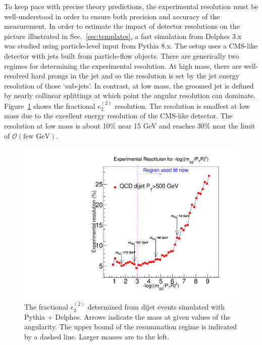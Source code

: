 To keep pace with precise theory predictions, the experimental resolution must be well-understood in order to ensure both precision and accuracy of the measurement.  In order to estimate the impact of detector resolutions on the picture illustrated in Sec.~\ref{sec:templates}, a fast simulation from Delphes 3.x~\cite{deFavereau:2013fsa} was studied using particle-level input from Pythia 8.x.  The setup uses a CMS-like detector with jets built from particle-flow objects.  There are generically two regimes for determining the experimental resolution.  At high mass, there are well-resolved hard prongs in the jet and so the resolution is set by the jet energy resolution of those `sub-jets'.  In contrast, at low mass, the groomed jet is defined by nearly collinear splittings at which point the angular resolution can dominate.  Figure~\ref{fig:resolution} shows the fractional $e_2^{(2)}$ resolution.  The resolution is smallest at low mass due to the excellent energy resolution of the CMS-like detector.  The resolution at low mass is about 10\% near 15 GeV and reaches 30\% near the limit of $\mathcal{O}(\text{few GeV})$.  

\begin{figure}[h!]
\begin{center}
\includegraphics[width = 0.49\columnwidth]{figures/Experimental_Resolution_logrho.pdf}
\end{center}
\caption{The fractional $e_2^{(2)}$ determined from dijet events simulated with Pythia + Delphes.  Arrows indicate the mass at given values of the angularity.  The upper bound of the resummation regime is indicated by a dashed line.  Larger masses are to the left.}
\label{fig:resolution}
\end{figure}

